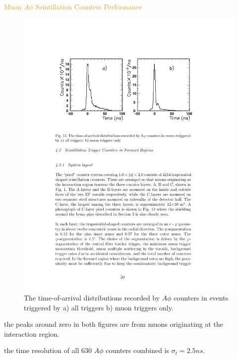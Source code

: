 \begin{frame}{\textcolor{Goldenrod}{Muon $A\phi$ Scintillation Counters Performance }}
  \begin{overlayarea}{\textwidth}{\textheight}
    \begin{figure}[h]\centering
      \includegraphics[height=0.4\textheight]{./Images/46_MD_Scint_03}
    \caption*{{\scriptsize The time-of-arrival distributions recorded by $A\phi$ counters in
        events triggered by a) all triggers b) muon triggers only.}}
    \end{figure}
    
    \itt
  \item the peaks around zero in both figures are from muons
    originating at the interaction region.
  \item
    the time resolution of all $630$ $A\phi$ counters combined is
    $\sigma_t = 2.5 ns$.
    
   \tti
  \end{overlayarea}
\end{frame}


